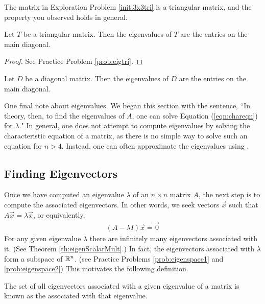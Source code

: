 \documentclass{ximera}
\begin{document}
The matrix in Exploration Problem \ref{init:3x3tri} is a triangular matrix, and the property you observed holds in general.

\begin{theorem}\label{th:eigtri}
Let $T$ be a triangular matrix.  Then the eigenvalues of $T$ are the entries on the main diagonal.
\end{theorem}

\begin{proof}
See Practice Problem \ref{prob:eigtri}.
\end{proof}

\begin{corollary}\label{th:eigdiag}
Let $D$ be a diagonal matrix.  Then the eigenvalues of $D$ are the entries on the main diagonal.
\end{corollary}

One final note about eigenvalues.  We began this section with the sentence, ``In theory, then, to find the eigenvalues of $A$, one can solve Equation (\ref{eqn:chareqn}) for $\lambda$."  In general, one does not attempt to compute eigenvalues by solving the characteristic equation of a matrix, as there is no simple way to solve such an equation for $n>4$.  Instead, one can often approximate the eigenvalues using .  

\subsection{Finding Eigenvectors}
Once we have computed an eigenvalue $\lambda$ of an $n \times n$ matrix $A$, the next step is to compute the associated eigenvectors.  In other words, we seek vectors $\vec{x}$ such that $A\vec{x}=\lambda \vec{x}$, or equivalently,
\begin{align}\label{eqn:nullspace}
 (A-\lambda I) \vec{x}=\vec{0}   
\end{align} 
For any given eigenvalue $\lambda$ there are infinitely many eigenvectors associated with it. (See Theorem \ref{th:eigenScalarMult}.)  In fact, the eigenvectors associated with $\lambda$ form a subspace of $\mathbb{R}^n$. (see Practice Problems \ref{prob:eigenspace1} and \ref{prob:eigenspace2})  This motivates the following definition.

\begin{definition}\label{def:eigspace}
The set of all eigenvectors associated with a given eigenvalue of a matrix is known as the  associated with that eigenvalue.
\end{definition}
\end{document}
